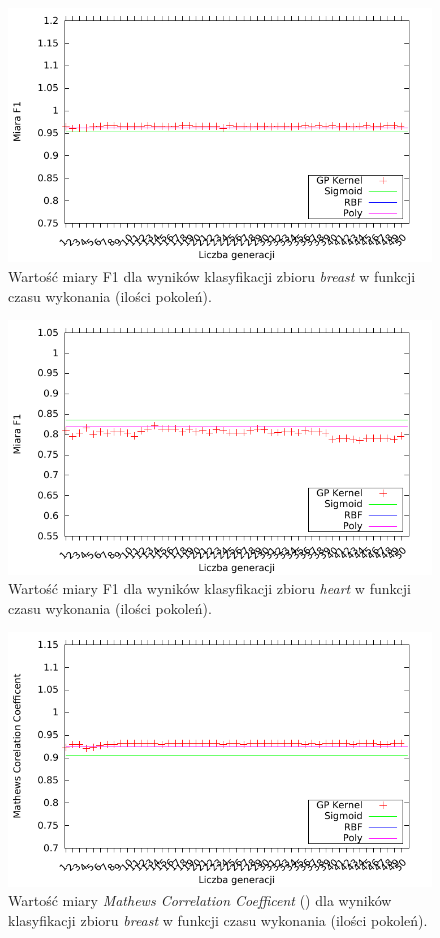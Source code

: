	\begin{figure}
		\includegraphics[scale=0.90]{figures/results/f1/f1-breast}
		\caption{Wartość miary F1 dla wyników klasyfikacji zbioru \emph{breast} w funkcji czasu wykonania (ilości pokoleń).\label{fig:f1-breast}}
	\end{figure}
	
	\begin{figure}
		\includegraphics[scale=0.90]{figures/results/f1/f1-heart}
		\caption{Wartość miary F1 dla wyników klasyfikacji zbioru \emph{heart} w funkcji czasu wykonania (ilości pokoleń).\label{fig:f1-heart}}
	\end{figure}
	
	\begin{figure}
		\includegraphics[scale=0.90]{figures/results/mcc/mcc-breast}
		\caption{Wartość miary \emph{Mathews Correlation Coefficent} () dla wyników klasyfikacji zbioru \emph{breast} w funkcji czasu wykonania (ilości pokoleń).\label{fig:mcc-breast}}
	\end{figure}
	
